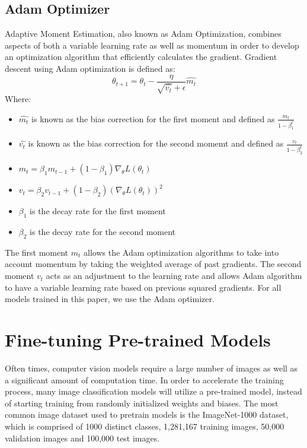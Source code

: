 \documentclass [MS] {uclathes}
\begin{document}
\subsection{Adam Optimizer}
Adaptive Moment Estimation, also known as Adam Optimization, combines aspects of both a variable learning rate as well 
as momentum in order to develop an optimization algorithm that efficiently calculates the gradient. Gradient descent 
using Adam optimization is defined as:
\[\theta_{t+1} = \theta_{t} - \frac{\eta}{\sqrt{\hat{v_t}} + \epsilon} \hat{m_{t}}\]
Where:
\begin{itemize}
    \item \(\hat{m_{t}}\) is known as the bias correction for the first moment and defined as \(\frac{m_t}{1-\beta_1^t}\)
    \item \(\hat{v_t}\) is known as the bias correction for the second momemt and defined as \(\frac{v_t}{1-\beta_2^t}\)
    \item \(m_t = \beta_1 m_{t-1} + (1 - \beta_1) \nabla_{\theta} L(\theta_t)\)
    \item \(v_t = \beta_2 v_{t-1} + (1 - \beta_2) (\nabla_{\theta} L(\theta_t))^2\)
    \item \(\beta_1\) is the decay rate for the first moment
    \item \(\beta_2\) is the decay rate for the second moment
\end{itemize}

The first moment \(m_t\) allows the Adam optimization algorithms to take into account momentum by taking the weighted 
average of past gradients. The second moment \(v_t\) acts as an adjustment to the learning rate and allows Adam 
algorithm to have a variable learning rate based on previous squared gradients. For all models trained in this paper, we 
use the Adam optimizer.

\section{Fine-tuning Pre-trained Models}
Often times, computer vision models require a large number of images as well as a significant amount of computation 
time. In order to accelerate the training process, many image classification models will utilize a pre-trained model, 
instead of starting training from randomly initialized weights and biases. The most common image dataset used to 
pretrain models is the ImageNet-1000 dataset, which is comprised of 1000 distinct classes, 1,281,167 training images, 
50,000 validation images and 100,000 test images.
\end{document}
